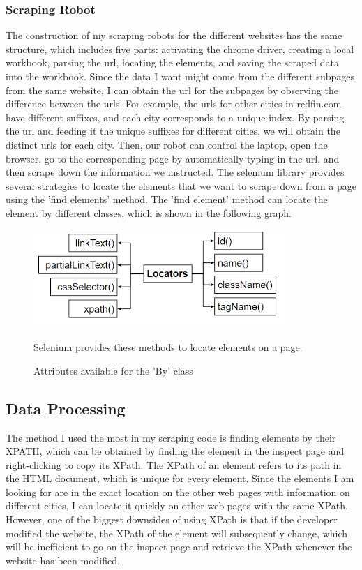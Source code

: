 \documentclass[10pt,twocolumn]{article}
\begin{document}
\subsubsection{Scraping Robot}
The construction of my scraping robots for the different websites has the same structure, which includes five parts: activating the chrome driver, creating a local workbook, parsing the url, locating the elements, and saving the scraped data into the workbook. Since the data I want might come from the different subpages from the same website, I can obtain the url for the subpages by observing the difference between the urls. For example, the urls for other cities in redfin.com have different suffixes, and each city corresponds to a unique index. By parsing the url and feeding it the unique suffixes for different cities, we will obtain the distinct urls for each city. Then, our robot can control the laptop, open the browser, go to the corresponding page by automatically typing in the url, and then scrape down the information we instructed. 
\newline
\indent
The selenium library provides several strategies to locate the elements that we want to scrape down from a page using the 'find elements' method. The 'find element' method can locate the element by different classes, which is shown in the following graph\cite{geeksforgeeks}. 
\begin{figure}[h!]
    \centering
    \includegraphics[width=.95\linewidth]{findelement.png}
    \caption{Attributes available for the 'By' class}
    \small
    Selenium provides these methods to locate elements on a page.
\end{figure}
\subsection{Data Processing}
The method I used the most in my scraping code is finding elements by their XPATH, which can be obtained by finding the element in the inspect page and right-clicking to copy its XPath. The XPath of an element refers to its path in the HTML document, which is unique for every element\cite{Viadya2022}. Since the elements I am looking for are in the exact location on the other web pages with information on different cities, I can locate it quickly on other web pages with the same XPath. However, one of the biggest downsides of using XPath is that if the developer modified the website, the XPath of the element will subsequently change, which will be inefficient to go on the inspect page and retrieve the XPath whenever the website has been modified.
\end{document}
